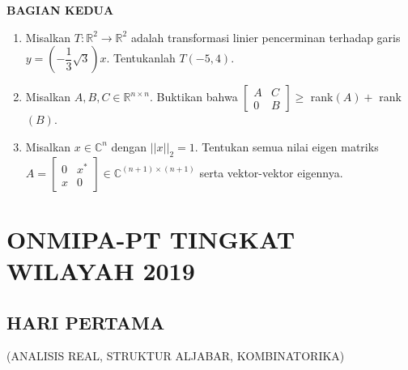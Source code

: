\documentclass[12pt,twoside]{article}
\begin{document}
\newpage \textbf{BAGIAN KEDUA}
\begin{enumerate}
	\item Misalkan $T : \mathbb{R}^2 \to \mathbb{R}^2$ adalah transformasi linier pencerminan terhadap garis $y = \left( - \dfrac{1}{3} \sqrt{3} \right)x.$ Tentukanlah $T(-5,4).$

	\item Misalkan $A,B,C \in \mathbb{R}^{n \times n}.$ Buktikan bahwa $\left[ \begin{array}{cc}
				      A & C \\0&B
			      \end{array} \right] \geq$ rank$(A) + $ rank$(B)$.

	\item Misalkan $x \in \mathbb{C}^n$ dengan $||x||_2 = 1.$ Tentukan semua nilai eigen matriks $A = \left[ \begin{array}{cc}
				      0 & x^* \\x&0
			      \end{array} \right] \in \mathbb{C}^{(n+1) \times (n+1)}$ serta vektor-vektor eigennya.
\end{enumerate}

\newpage
{}
\section{ONMIPA-PT TINGKAT WILAYAH 2019}
\subsection{HARI PERTAMA}
\begin{center}
	(ANALISIS REAL, STRUKTUR ALJABAR, KOMBINATORIKA)
\end{center}
\end{document}
